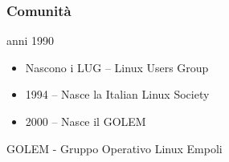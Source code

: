 \documentclass{beamer}
\begin{document}
\begin{frame}
    \frametitle{Comunità}

    \begin{block}{anni 1990}
    \begin{itemize}
        \item Nascono i LUG -- Linux Users Group
        \item 1994 -- Nasce la Italian Linux Society
        \item 2000 -- Nasce il GOLEM
    \end{itemize}
    \end{block}
    \pause

    \begin{block}{GOLEM - Gruppo Operativo Linux Empoli}
        \begin{minipage}{.1\linewidth}
        \end{minipage}

\end{block}
\end{frame}
\end{document}

